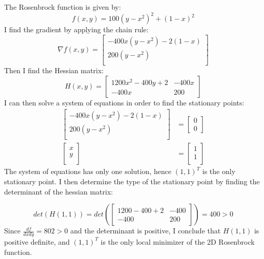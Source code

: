 \documentclass[a4paper]{article}
\begin{document}
\section{}
The Rosenbrock function is given by:
$$
f(x,y) = 100(y - x^2)^2 + (1 - x)^2
$$
I find the gradient by applying the chain rule:
\[
\nabla f(x,y) = 
\begin{bmatrix}
    -400x(y - x^2) - 2(1-x) \\
    200(y - x^2)            \\
\end{bmatrix}
\]
Then I find the Hessian matrix:
\[
H(x,y) = 
\begin{bmatrix}
    1200x^2 - 400y + 2 & -400x     \\
    -400x & 200
\end{bmatrix}
\]
I can then solve a system of equations in order to find the stationary points:
\begin{align*}
\begin{bmatrix}
    -400x(y - x^2) - 2(1-x) \\
    200(y - x^2)            \\
\end{bmatrix}
&=
\begin{bmatrix}
    0 \\
    0    
\end{bmatrix}\\
\begin{bmatrix}
    x \\
    y \\
\end{bmatrix}
&=
\begin{bmatrix}
    1 \\
    1 \\
\end{bmatrix}
\end{align*}
The system of equations has only one solution, hence $(1,1)^T$ is the only
stationary point. I then determine the type of the stationary point by 
finding the determinant of the hessian matrix:

\[
det(H(1,1)) = 
det\left(\begin{bmatrix}
    1200 - 400 + 2 & -400     \\
    -400 & 200
\end{bmatrix}\right)
= 400 > 0
\]
Since $\frac{df}{dxdy} = 802 > 0$ and the determinant is positive, I conclude that
$H(1,1)$ is positive definite, and $(1,1)^T$ is the only local minimizer of the
2D Rosenbrock function.
\end{document}
